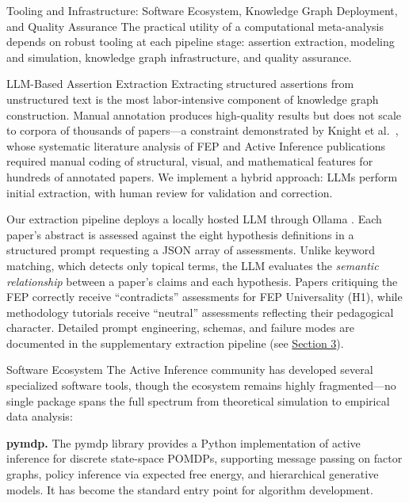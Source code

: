 \documentclass[
  ignorenonframetext,
]{beamer}
\author{\texorpdfstring{}{}}
\date{}
\begin{document}
\begin{frame}[fragile]{Tooling and Infrastructure: Software Ecosystem,
Knowledge Graph Deployment, and Quality Assurance \label{sec:tooling}}
\protect{}\label{tooling-and-infrastructure-software-ecosystem-knowledge-graph-deployment-and-quality-assurance}
The practical utility of a computational meta-analysis depends on robust
tooling at each pipeline stage: assertion extraction, modeling and
simulation, knowledge graph infrastructure, and quality assurance.

\begin{block}{LLM-Based Assertion Extraction}
\protect{}\label{llm-based-assertion-extraction}
Extracting structured assertions from unstructured text is the most
labor-intensive component of knowledge graph construction. Manual
annotation produces high-quality results but does not scale to corpora
of thousands of papers---a constraint demonstrated by Knight et
al.~\citep{knight2022fep}, whose systematic literature analysis of FEP
and Active Inference publications required manual coding of structural,
visual, and mathematical features for hundreds of annotated papers. We
implement a hybrid approach: LLMs perform initial extraction, with human
review for validation and correction.

Our extraction pipeline deploys a locally hosted LLM through Ollama
\citep{ollama2024}. Each paper's abstract is assessed against the eight
hypothesis definitions in a structured prompt requesting a JSON array of
assessments. Unlike keyword matching, which detects only topical terms,
the LLM evaluates the \emph{semantic relationship} between a paper's
claims and each hypothesis. Papers critiquing the FEP correctly receive
``contradicts'' assessments for FEP Universality (H1), while methodology
tutorials receive ``neutral'' assessments reflecting their pedagogical
character. Detailed prompt engineering, schemas, and failure modes are
documented in the supplementary extraction pipeline (see
\hyperref[sec:extraction_pipeline]{Section 3}).
\end{block}

\begin{block}{Software Ecosystem}
\protect{}\label{software-ecosystem}
The Active Inference community has developed several specialized
software tools, though the ecosystem remains highly fragmented---no
single package spans the full spectrum from theoretical simulation to
empirical data analysis:

\textbf{pymdp.} The pymdp library \citep{heins2022pymdp} provides a
Python implementation of active inference for discrete state-space
POMDPs, supporting message passing on factor graphs, policy inference
via expected free energy, and hierarchical generative models. It has
become the standard entry point for algorithm development.


\end{block}
\end{frame}
\end{document}
